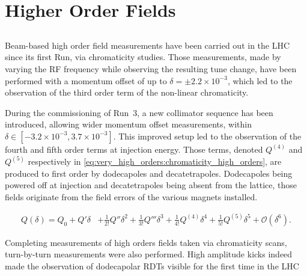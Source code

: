 \chapter{Higher Order Fields}
\thumbforchapter{}
\chaptertoc{}
\newpage

\section{}

Beam-based high order field measurements have been carried out in the LHC since its first
Run, via chromaticity studies.
Those measurements, made by varying the RF frequency while observing the resulting tune change, have
been performed with a momentum offset of up to $\delta = \pm 2.2 \times 10^{-3}$, which led to the
observation of the third order term of the non-linear chromaticity.

During the commissioning of Run~3, a new collimator sequence has been introduced, allowing wider
momentum offset measurements, within $\delta \in [-3.2\times 10^{-3},3.7 \times 10^{-3}]$. This
improved setup led to the observation of the fourth and fifth order terms at injection energy.
Those terms, denoted $Q^{(4)}$ and $Q^{(5)}$ respectively in
\cref{eq:very_high_orders:chromaticity_high_orders}, are produced to first order by dodecapoles and
decatetrapoles. Dodecapoles being powered off at injection and decatetrapoles being absent from the
lattice, those fields originate from the field errors of the various magnets installed.

\begin{equation}
\begin{aligned}
Q(\delta) = Q_0 + Q'\delta &+ \frac{1}{2!}Q''\delta^2 + \frac{1}{3!}Q'''\delta^3
                            + \frac{1}{4!}Q^{(4)}\delta^4  + \frac{1}{5!}Q^{(5)}\delta^5
                            + \mathcal{O}(\delta^6).
\end{aligned}
    \label{eq:very_high_orders:chromaticity_high_orders}
\end{equation}

Completing measurements of high orders fields taken via chromaticity scans, turn-by-turn
measurements were also performed. High amplitude kicks indeed made the observation of dodecapolar
RDTs visible for the first time in the LHC




